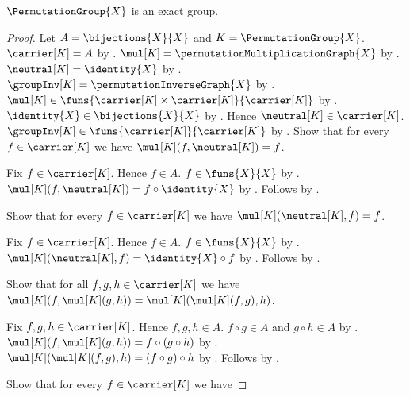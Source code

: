 \begin{theorem}\label{permutation_group_is_exact_group}
    $\PermutationGroup{X}$ is an exact group.
\end{theorem}
\begin{proof}
    Let $A=\bijections{X}{X}$ and $K=\PermutationGroup{X}$.
    $\carrier[K]=A$ by .
    $\mul[K]=\permutationMultiplicationGraph{X}$ by
        .
    $\neutral[K]=\identity{X}$ by
        .
    $\groupInv[K]=\permutationInverseGraph{X}$ by
        .
    $\mul[K]\in\funs{\carrier[K]\times\carrier[K]}{\carrier[K]}$ by
        .
    $\identity{X}\in\bijections{X}{X}$ by
        .
    Hence $\neutral[K]\in\carrier[K]$.
    $\groupInv[K]\in\funs{\carrier[K]}{\carrier[K]}$ by
        .
    Show that for every $f\in\carrier[K]$ we have
        $\mul[K](f,\neutral[K])=f$.
    \begin{subproof}
        Fix $f\in\carrier[K]$.
        Hence $f\in A$.
        $f\in\funs{X}{X}$ by .
        $\mul[K](f,\neutral[K])=f\circ\identity{X}$ by
            .
        Follows by .
    \end{subproof}
    Show that for every $f\in\carrier[K]$ we have
        $\mul[K](\neutral[K],f)=f$.
    \begin{subproof}
        Fix $f\in\carrier[K]$.
        Hence $f\in A$.
        $f\in\funs{X}{X}$ by .
        $\mul[K](\neutral[K],f)=\identity{X}\circ f$ by
            .
        Follows by .
    \end{subproof}
    Show that for all $f,g,h\in\carrier[K]$ we have
        $\mul[K](f,\mul[K](g,h))=
            \mul[K](\mul[K](f,g),h)$.
    \begin{subproof}
        Fix $f,g,h\in\carrier[K]$.
        Hence $f,g,h\in A$.
        $f\circ g\in A$ and $g\circ h\in A$ by
            .
        $\mul[K](f,\mul[K](g,h))=f\circ(g\circ h)$ by
            .
        $\mul[K](\mul[K](f,g),h)=(f\circ g)\circ h$ by
            .
        Follows by .
    \end{subproof}
    Show that for every $f\in\carrier[K]$ we have

\end{proof}

